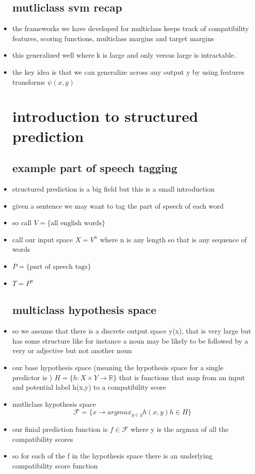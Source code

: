 \documentclass{article}
\begin{document}
\begin{itemize}
\subsection*{mutliclass svm recap}
\item the frameworks we have developed for multiclass keeps track of compatibility features, scoring functions, multiclass margins and target margins 
\item this generalized well where k is large and only versus large is intractable. 
\item the key idea is that we can generalize across any output y by using features transforms $\psi(x,y)$
\section{introduction to structured prediction}
\subsection*{example part of speech tagging}
\item structured prediction is a big field but this is a small introduction 
\item given a sentence we may want to tag the part of speech of each word
\item so call $V=\{\text{all english words}\}$
\item call our input space $X=V^{n}$ where n is any length so that is any sequence of words
\item $P=\{\text{part of speech tags}\}$
\item $T=P^n$
\subsection*{multiclass hypothesis space}
\item so we assume that there is a discrete output space y(x), that is very large but has some structure like for instance a noun may be likely to be followed by a very or adjective but not another noun
\item our base hypothesis space (meaning the hypothesis space for a single predictor is ) $H=\{h:X\times Y \rightarrow \mathbb{R}\}$ that is functions that map from an input and potential label h(x,y) to a compatibility score
\item mutliclass hypothesis space $$\mathcal{F}=\{x\rightarrow argmax_{y\in y} h(x,y)h\in H\}$$
\item our finial prediction function is $f\in \mathcal{F}$ where y is the argmax of all the compatibility scores
\item so for each of the f in the hypothesis space there is an underlying compatibility score function 

\end{itemize}
\end{document}
